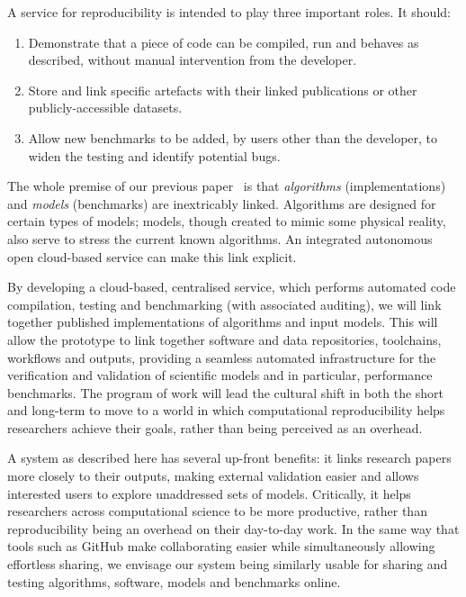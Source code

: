 \documentclass[a4paper,11pt]{article}
\begin{document}
A service for reproducibility is intended to play three important
roles. It should:

\begin{enumerate}
\item Demonstrate that a piece of code can be compiled, run
and behaves as described, without manual intervention from the
developer.
\item Store and link specific artefacts with their linked
publications or other publicly-accessible datasets.
\item Allow new benchmarks to be added, by users other than
the developer, to widen the testing and identify potential bugs.
\end{enumerate}

The whole premise of our previous paper~\cite{crick-et-al_recomp2014}
is that {\emph{algorithms}} (implementations) and {\emph{models}}
(benchmarks) are inextricably linked. Algorithms are designed for
certain types of models; models, though created to mimic some physical
reality, also serve to stress the current known algorithms. An
integrated autonomous open cloud-based service can make this link explicit.

By developing a cloud-based, centralised service, which performs
automated code compilation, testing and benchmarking (with associated
auditing), we will link together published implementations of
algorithms and input models. This will allow the prototype to link
together software and data repositories, toolchains, workflows and
outputs, providing a seamless automated infrastructure for the
verification and validation of scientific models and in particular,
performance benchmarks. The program of work will lead the cultural
shift in both the short and long-term to move to a world in which
computational reproducibility helps researchers achieve their goals,
rather than being perceived as an overhead.

A system as described here has several up-front benefits: it links
research papers more closely to their outputs, making external
validation easier and allows interested users to explore unaddressed
sets of models. Critically, it helps researchers across computational
science to be more productive, rather than reproducibility being an
overhead on their day-to-day work. In the same way that tools such as
GitHub make collaborating easier while simultaneously allowing
effortless sharing, we envisage our system being similarly usable for
sharing and testing algorithms, software, models and benchmarks
online.
\end{document}
